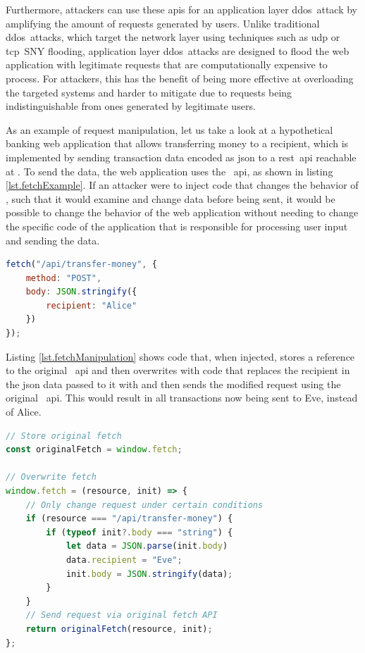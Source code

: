Furthermore, attackers can use these \acsp{api} for an application layer \ac{ddos}~attack by amplifying the amount of requests generated by users. Unlike traditional \ac{ddos}~attacks, which target the network layer using techniques such as \acs{udp} or \acs{tcp}~SNY flooding, application layer \ac{ddos}~attacks are designed to flood the web application with legitimate requests that are computationally expensive to process. For attackers, this has the benefit of being more effective at overloading the targeted systems and harder to mitigate due to requests being indistinguishable from ones generated by legitimate users. \cite{ApplicationLayerDDoS}

As an example of request manipulation, let us take a look at a hypothetical banking web application that allows transferring money to a recipient, which is implemented by sending transaction data encoded as \acs{json} to a \acs{rest}~\acs{api} reachable at . To send the data, the web application uses the ~\acs{api}, as shown in listing \ref{lst.fetchExample}. If an attacker were to inject code that changes the behavior of , such that it would examine and change data before being sent, it would be possible to change the behavior of the web application without needing to change the specific code of the application that is responsible for processing user input and sending the data.

\begin{lstlisting}[language=JavaScript,label={lst.fetchExample},caption={Fetch request with \acs{json} data}]
fetch("/api/transfer-money", {
    method: "POST",
    body: JSON.stringify({
        recipient: "Alice"
    })
});
\end{lstlisting}

Listing \ref{lst.fetchManipulation} shows code that, when injected, stores a reference to the original ~\acs{api} and then overwrites  with code that replaces the recipient in the \acs{json} data passed to it with  and then sends the modified request using the original ~\acs{api}. This would result in all transactions now being sent to Eve, instead of Alice.

\begin{lstlisting}[language=JavaScript,label={lst.fetchManipulation},caption={Overwriting fetch to manipulate data under certain conditions}]
// Store original fetch
const originalFetch = window.fetch;

// Overwrite fetch
window.fetch = (resource, init) => {
    // Only change request under certain conditions
    if (resource === "/api/transfer-money") {
        if (typeof init?.body === "string") {
            let data = JSON.parse(init.body)
            data.recipient = "Eve";
            init.body = JSON.stringify(data);
        }
    }
    // Send request via original fetch API
    return originalFetch(resource, init);
};
\end{lstlisting}



